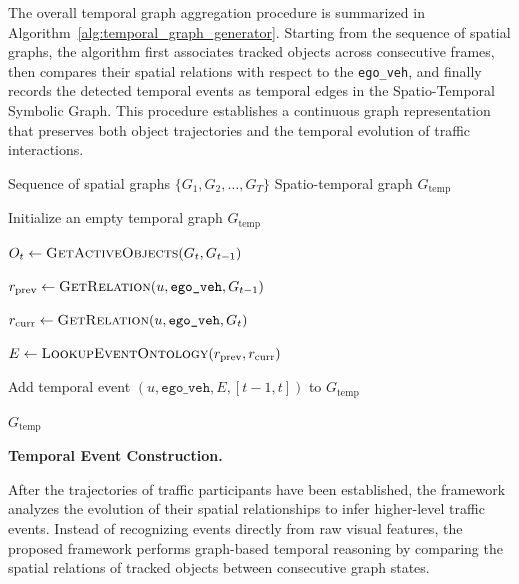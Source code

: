\documentclass[a4paper, 11pt]{article} %
\begin{document}
The overall temporal graph aggregation procedure is summarized in Algorithm~\ref{alg:temporal_graph_generator}. Starting from the sequence of spatial graphs, the algorithm first associates tracked objects across consecutive frames, then compares their spatial relations with respect to the \texttt{ego\_veh}, and finally records the detected temporal events as temporal edges in the Spatio-Temporal Symbolic Graph. This procedure establishes a continuous graph representation that preserves both object trajectories and the temporal evolution of traffic interactions.
\begin{algorithm}[H]
\caption{Temporal Graph Construction and Event Aggregation}
\label{alg:temporal_graph_generator}

\begin{algorithmic}[1]

\Require Sequence of spatial graphs $\{G_1,G_2,\ldots,G_T\}$
\Ensure Spatio-temporal graph $G_{\mathrm{temp}}$

\State Initialize an empty temporal graph $G_{\mathrm{temp}}$


    \State $O_t \gets \textsc{GetActiveObjects}(G_t,G_{t-1})$


        \State $r_{\mathrm{prev}}
            \gets
            \textsc{GetRelation}(u,\texttt{ego\_veh},G_{t-1})$

        \State $r_{\mathrm{curr}}
            \gets
            \textsc{GetRelation}(u,\texttt{ego\_veh},G_t)$


        \State $E
            \gets
            \textsc{LookupEventOntology}
            (r_{\mathrm{prev}},r_{\mathrm{curr}})$

            \State Add temporal event
            $(u,\texttt{ego\_veh},E,[t-1,t])$
            to $G_{\mathrm{temp}}$
        \EndIf

    \EndFor

\EndFor

\State \Return $G_{\mathrm{temp}}$

\end{algorithmic}
\end{algorithm}
\textbf{Temporal Event Construction.}

After the trajectories of traffic participants have been established, the framework analyzes the evolution of their spatial relationships to infer higher-level traffic events. Instead of recognizing events directly from raw visual features, the proposed framework performs graph-based temporal reasoning by comparing the spatial relations of tracked objects between consecutive graph states.
\end{document}
